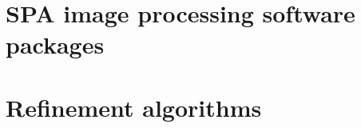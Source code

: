 \documentclass[../main.tex]{subfiles}
\begin{document}
\section{SPA image processing software packages}


\section{Refinement algorithms}

\end{document}
